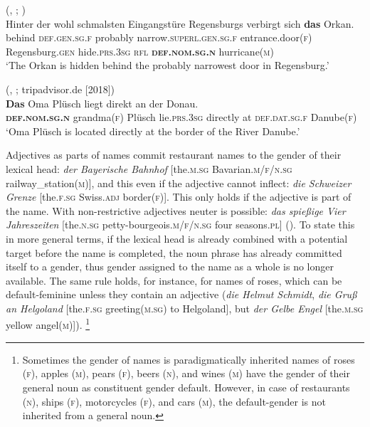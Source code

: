 \documentclass[output=collectionpaper]{langsci/langscibook}
\begin{document}
\ea\label{ex:WDG:54}
 (, ; \citealt[132]{Angerer2009})\\
\gll Hinter	der	wohl	schmalsten	Eingangstüre Regensburgs	verbirgt	sich	\textbf{das}	Orkan.\\
behind	\textsc{def.gen.sg.f}	probably	narrow.\textsc{superl.gen.sg.f}	entrance.door(\textsc{f}) Regensburg.\textsc{gen}	hide.\textsc{prs.3sg}	\textsc{rfl}	\textbf{\textsc{def.nom.sg.n}}	hurricane(\textsc{m})\\
\glt `The Orkan is hidden behind the probably narrowest door in Regensburg.'\\
\z

\ea\label{ex:WDG:55}
 (, ; tripadvisor.de [2018])\\
\gll \textbf{Das}	Oma	Plüsch	liegt	direkt	an	der	Donau.\\
\textbf{\textsc{def.nom.sg.n}}	grandma(\textsc{f})	Plüsch	lie.\textsc{prs.3sg}	directly	at	\textsc{def.dat.sg.f}	Danube(\textsc{f})\\
\glt `Oma Plüsch is located directly at the border of the River Danube.'\\
\z

Adjectives as parts of names commit restaurant names to the gender of their lexical head: \textit{der Bayerische Bahnhof} [the.\textsc{m.sg} Bavarian.\textsc{m/f/n.sg} railway\_station(\textsc{m})], and this even if the adjective cannot inflect: \textit{die Schweizer Grenze} [the.\textsc{f.sg} Swiss.\textsc{adj} border(\textsc{f})]. This only holds if the adjective is part of the name. With non-restrictive adjectives neuter is possible: \textit{das spießige Vier Jahreszeiten} [the.\textsc{n.sg} petty-bourgeois.\textsc{m/f/n.sg} four seasons.\textsc{pl}] (\citealt{Plank2015}). To state this in more general terms, if the lexical head is already combined with a potential target before the name is completed, the noun phrase has already committed itself to a gender, thus gender assigned to the name as a whole is no longer available. The same rule holds, for instance, for names of roses, which can be default-feminine unless they contain an adjective (\textit{die Helmut Schmidt}, \textit{die Gruß an Helgoland} [the.\textsc{f.sg} greeting(\textsc{m.sg}) to Helgoland], but \textit{der Gelbe Engel} [the.\textsc{m.sg} yellow angel(\textsc{m})]).%
\footnote{%
Sometimes the gender of names is paradigmatically inherited \textendash{} names of roses (\textsc{f}), apples (\textsc{m}), pears (\textsc{f}), beers (\textsc{n}), and wines (\textsc{m}) have the gender of their general noun as constituent gender default. However, in case of restaurants (\textsc{n}), ships (\textsc{f}), motorcycles (\textsc{f}), and cars (\textsc{m}), the default-gender is not inherited from a general noun.
} %
\end{document}
